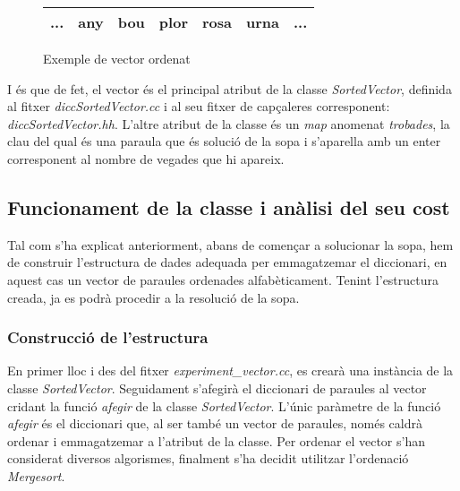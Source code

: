 \documentclass[titlepage]{article}
\begin{document}
\begin{center}
    \begin{figure}[h!]
        \begin{center}
            \begin{tabular}{ |c|c|c|c|c|c|c| } 
             \hline
                 ... & any & bou & plor & rosa & urna & ...\\ 
             \hline
            \end{tabular}
        \end{center}
            \caption{Exemple de vector ordenat}
            \label{fig:sortedVector}
    \end{figure}
\end{center}

I és que de fet, el vector és el principal atribut de la classe \textit{SortedVector}, definida al fitxer \textit{diccSortedVector.cc} i al seu fitxer de capçaleres corresponent: \textit{diccSortedVector.hh}. L'altre atribut de la classe és un \textit{map} anomenat \textit{trobades}, la clau del qual és una paraula que és solució de la sopa i s'aparella amb un enter corresponent al nombre de vegades que hi apareix.
\newline\par

\subsection{Funcionament de la classe i anàlisi del seu cost}

Tal com s'ha explicat anteriorment, abans de començar a solucionar la sopa, hem de construir l'estructura de dades adequada per emmagatzemar el diccionari, en aquest cas un vector de paraules ordenades alfabèticament. Tenint l'estructura creada, ja es podrà procedir a la resolució de la sopa.

\subsubsection{Construcció de l'estructura}
En primer lloc i des del fitxer \textit{experiment\_vector.cc}, es crearà una instància de la classe \textit{SortedVector}. Seguidament s'afegirà el diccionari de paraules al vector cridant la funció \textit{afegir} de la classe \textit{SortedVector}. L'únic paràmetre de la funció \textit{afegir} és el diccionari que, al ser també un vector de paraules, només caldrà ordenar i emmagatzemar a l'atribut de la classe. Per ordenar el vector s'han considerat diversos algorismes, finalment s'ha decidit utilitzar l'ordenació \textit{Mergesort}.
\end{document}
